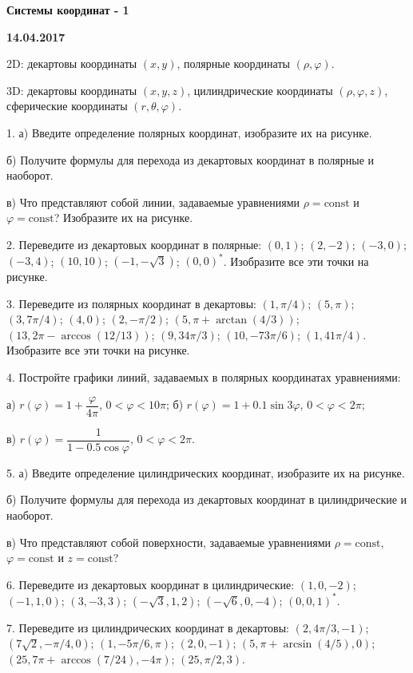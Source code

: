 \documentclass[14pt]{article}
\begin{document}
\begin{center}
\Large{\textbf{Системы координат - 1}}

\textbf{14.04.2017}

\vspace{5mm}
\end{center}

2D: декартовы координаты $(x,y)$, полярные координаты $(\rho,\varphi)$.

3D: декартовы координаты $(x,y,z)$, цилиндрические координаты $(\rho,\varphi,z)$, сферические координаты $(r,\theta,\varphi)$.

1. а) Введите определение полярных координат, изобразите их на рисунке.

б) Получите формулы для перехода из декартовых координат в полярные и наоборот.

в) Что представляют собой линии, задаваемые уравнениями $\rho=\text{const}$ и $\varphi=\text{const}$? Изобразите их на рисунке.

2. Переведите из декартовых координат в полярные: $(0,1)$; $(2,-2)$; $(-3,0)$; $(-3,4)$; $(10,10)$; $(-1,-\sqrt3)$; $(0,0)^*$. Изобразите все эти точки на рисунке.

3. Переведите из полярных координат в декартовы: $(1,\pi/4)$; $(5,\pi)$; $(3,7\pi/4)$; $(4,0)$; $(2,-\pi/2)$; $(5,\pi+\arctan(4/3))$; $(13,2\pi-\arccos(12/13))$; $(9,34\pi/3)$; $(10,-73\pi/6)$; $(1,41\pi/4)$. Изобразите все эти точки на рисунке.

4. Постройте графики линий, задаваемых в полярных координатах уравнениями:

а) $r(\varphi)=1+\dfrac{\varphi}{4\pi}$, $0<\varphi<10\pi$;
\hspace{3cm}
б) $r(\varphi)=1+0.1\sin 3\varphi$, $0<\varphi<2\pi$;

в) $r(\varphi)=\dfrac{1}{1-0.5\cos\varphi}$, $0<\varphi<2\pi$.

5. а) Введите определение цилиндрических координат, изобразите их на рисунке.

б) Получите формулы для перехода из декартовых координат в цилиндрические и наоборот.

в) Что представляют собой поверхности, задаваемые уравнениями $\rho=\text{const}$, $\varphi=\text{const}$ и $z=\text{const}$?

6. Переведите из декартовых координат в цилиндрические: $(1,0,-2)$; $(-1,1,0)$; $(3,-3,3)$; $(-\sqrt3,1,2)$; $(-\sqrt6,0,-4)$; $(0,0,1)^*$.

7. Переведите из цилиндрических координат в декартовы: $(2,4\pi/3,-1)$; $(7\sqrt2,-\pi/4,0)$; $(1,-5\pi/6,\pi)$; $(2,0,-1)$; $(5,\pi+\arcsin(4/5),0)$; $(25,7\pi+\arccos(7/24),-4\pi)$; $(25,\pi/2,3)$.
\end{document}
